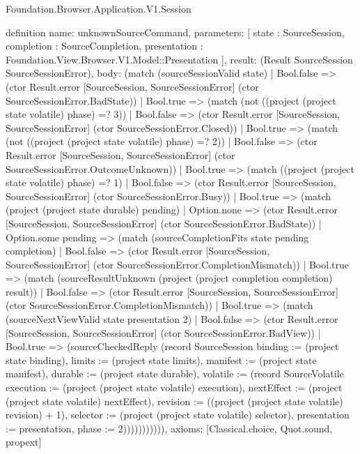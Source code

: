 \begin{lexlean}{Foundation.Browser.Application.V1.Session}
\begin{semanticmodule}
definition{
  name: unknownSourceCommand,
  parameters: [
    state : SourceSession,
    completion : SourceCompletion,
    presentation : Foundation.View.Browser.V1.Model::Presentation
  ],
  result: (Result SourceSession SourceSessionError),
  body: (match (sourceSessionValid state)
    | Bool.false => (ctor Result.error [SourceSession, SourceSessionError] (ctor SourceSessionError.BadState))
    | Bool.true => (match (not ((project (project state volatile) phase) =? 3))
      | Bool.false => (ctor Result.error [SourceSession, SourceSessionError] (ctor SourceSessionError.Closed))
      | Bool.true => (match (not ((project (project state volatile) phase) =? 2))
        | Bool.false => (ctor Result.error [SourceSession, SourceSessionError] (ctor SourceSessionError.OutcomeUnknown))
        | Bool.true => (match ((project (project state volatile) phase) =? 1)
          | Bool.false => (ctor Result.error [SourceSession, SourceSessionError] (ctor SourceSessionError.Busy))
          | Bool.true => (match (project (project state durable) pending)
            | Option.none => (ctor Result.error [SourceSession, SourceSessionError] (ctor SourceSessionError.BadState))
            | Option.some pending => (match (sourceCompletionFits state pending completion)
              | Bool.false => (ctor Result.error [SourceSession, SourceSessionError] (ctor SourceSessionError.CompletionMismatch))
              | Bool.true => (match (sourceResultUnknown (project (project completion completion) result))
                | Bool.false => (ctor Result.error [SourceSession, SourceSessionError] (ctor SourceSessionError.CompletionMismatch))
                | Bool.true => (match (sourceNextViewValid state presentation 2)
                  | Bool.false => (ctor Result.error [SourceSession, SourceSessionError] (ctor SourceSessionError.BadView))
                  | Bool.true => (sourceCheckedReply (record SourceSession {binding := (project state binding), limits := (project state limits), manifest := (project state manifest), durable := (project state durable), volatile := (record SourceVolatile {execution := (project (project state volatile) execution), nextEffect := (project (project state volatile) nextEffect), revision := ((project (project state volatile) revision) + 1), selector := (project (project state volatile) selector), presentation := presentation, phase := 2})})))))))))),
  axioms: [Classical.choice, Quot.sound, propext]
}


\end{semanticmodule}
\end{lexlean}
